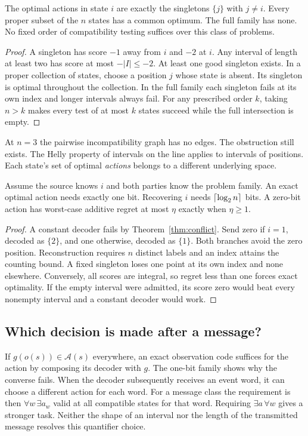 \begin{theorem}\label{thm:conflict}
The optimal actions in state $i$ are exactly the singletons $\{j\}$ with $j\ne i$. Every proper subset of the $n$ states has a common optimum. The full family has none. No fixed order of compatibility testing suffices over this class of problems.
\end{theorem}
\begin{proof}
A singleton has score $-1$ away from $i$ and $-2$ at $i$. Any interval of length at least two has score at most $-|I|\le-2$. At least one good singleton exists. In a proper collection of states, choose a position $j$ whose state is absent. Its singleton is optimal throughout the collection. In the full family each singleton fails at its own index and longer intervals always fail. For any prescribed order $k$, taking $n>k$ makes every test of at most $k$ states succeed while the full intersection is empty.
\end{proof}
At $n=3$ the pairwise incompatibility graph has no edges. The obstruction still exists. The Helly property of intervals on the line applies to intervals of positions. Each state's set of optimal \emph{actions} belongs to a different underlying space.

\begin{corollary}\label{cor:onebit}
Assume the source knows $i$ and both parties know the problem family. An exact optimal action needs exactly one bit. Recovering $i$ needs $\left\lceil \log_2 n\right\rceil$ bits. A zero-bit action has worst-case additive regret at most $\eta$ exactly when $\eta\ge1$.
\end{corollary}
\begin{proof}
A constant decoder fails by Theorem~\ref{thm:conflict}. Send zero if $i=1$, decoded as $\{2\}$, and one otherwise, decoded as $\{1\}$. Both branches avoid the zero position. Reconstruction requires $n$ distinct labels and an index attains the counting bound. A fixed singleton loses one point at its own index and none elsewhere. Conversely, all scores are integral, so regret less than one forces exact optimality. If the empty interval were admitted, its score zero would beat every nonempty interval and a constant decoder would work.
\end{proof}

\subsection{Which decision is made after a message?}
If $g(o(s))\in\mathcal A(s)$ everywhere, an exact observation code suffices for the action by composing its decoder with $g$. The one-bit family shows why the converse fails. When the decoder subsequently receives an event word, it can choose a different action for each word. For a message class the requirement is then $\forall w\,\exists a_w$ valid at all compatible states for that word. Requiring $\exists a\,\forall w$ gives a stronger task. Neither the shape of an interval nor the length of the transmitted message resolves this quantifier choice.
